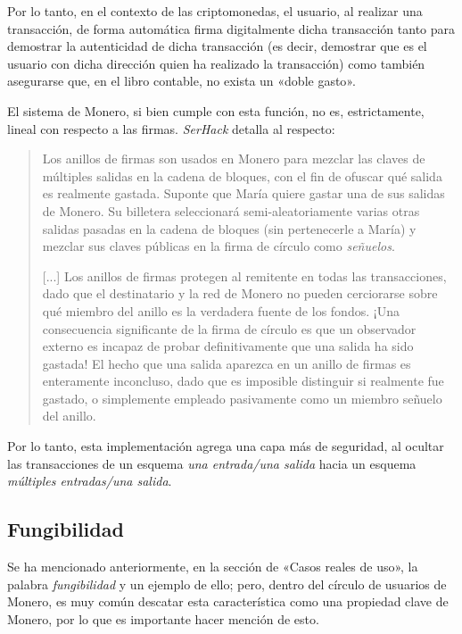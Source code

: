 \documentclass[12pt,a4paper,twoside]{book}
\begin{document}
Por lo tanto, en el contexto de las criptomonedas, el usuario, al realizar una transacción, de forma automática firma digitalmente dicha transacción tanto para demostrar la autenticidad de dicha transacción (es decir, demostrar que es el usuario con dicha dirección quien ha realizado la transacción) como también asegurarse que, en el libro contable, no exista un «doble gasto».

El sistema de Monero, si bien cumple con esta función, no es, estrictamente, lineal con respecto a las firmas. \textit{SerHack} detalla al respecto:

\begin{quotation}
Los anillos de firmas son usados en Monero para mezclar las claves de múltiples salidas en la cadena de bloques, con el fin de ofuscar qué salida es realmente gastada. Suponte que María quiere gastar una de sus salidas de Monero. Su billetera seleccionará semi-aleatoriamente varias otras salidas pasadas en la cadena de bloques (sin pertenecerle a María) y mezclar sus claves públicas en la firma de círculo como \textit{señuelos}.

[...] Los anillos de firmas protegen al remitente en todas las transacciones, dado que el destinatario y la red de Monero no pueden cerciorarse sobre qué miembro del anillo es la verdadera fuente de los fondos. ¡Una consecuencia significante de la firma de círculo es que un observador externo es incapaz de probar definitivamente que una salida ha sido gastada! El hecho que una salida aparezca en un anillo de firmas es enteramente inconcluso, dado que es imposible distinguir si realmente fue gastado, o simplemente empleado pasivamente como un miembro señuelo del anillo. \cite[págs. 68]{monero:master}
\end{quotation}

Por lo tanto, esta implementación agrega una capa más de seguridad, al ocultar las transacciones de un esquema \textit{una entrada/una salida} hacia un esquema \textit{múltiples entradas/una salida}.

\subsection{Fungibilidad}
Se ha mencionado anteriormente, en la sección de «Casos reales de uso», la palabra \textit{fungibilidad} y un ejemplo de ello; pero, dentro del círculo de usuarios de Monero, es muy común descatar esta característica como una propiedad clave de Monero, por lo que es importante hacer mención de esto.
\end{document}
